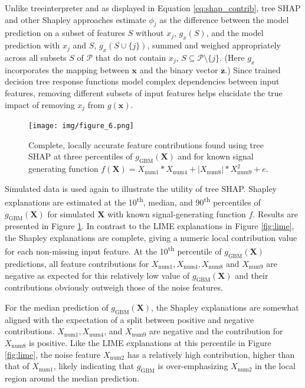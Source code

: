 \documentclass[sigconf, review]{acmart}
\begin{document}
\noindent Unlike treeinterpreter and as displayed in Equation \ref{eq:shap_contrib}, tree SHAP and other Shapley approaches estimate $\phi_j$ as the difference between the model prediction on a subset of features $S$ without $x_j$, $g_x(S)$, and the model prediction with $x_j$ and $S$, $g_x(S \cup \{j\})$, summed and weighed appropriately across all subsets $S$ of $\mathcal{P}$ that do not contain $x_j$, $S \subseteq \mathcal{P} \setminus \{j\}$. (Here $g_x$ incorporates the mapping between $\mathbf{x}$ and the binary vector $\mathbf{z}$.) Since trained decision tree response functions model complex dependencies between input features, removing different subsets of input features helps elucidate the true impact of removing $x_j$ from $g(\mathbf{x})$.

\begin{figure}[htb]
	\begin{center}
		\texttt{[image: img/figure\_6.png]}
		\caption{Complete, locally accurate feature contributions found using tree SHAP at three percentiles of $g_{\text{GBM}}(\mathbf{X})$ and for known signal generating function $f(\mathbf{X}) = X_{\text{num}1} * X_{\text{num}4} + |X_{\text{num}8}| * X_{\text{num}9}^2 + e$.}
		\label{fig:shap}
	\end{center}
\end{figure}

Simulated data is used again to illustrate the utility of tree SHAP. Shapley explanations are estimated at the 10\textsuperscript{th}, median, and 90\textsuperscript{th} percentiles of $g_{\text{GBM}}(\mathbf{X})$ for simulated $\mathbf{X}$ with known signal-generating function $f$. Results are presented in Figure \ref{fig:shap}. In contrast to the LIME explanations in Figure \ref{fig:lime}, the Shapley explanations are complete, giving a numeric local contribution value for each non-missing input feature. At the 10\textsuperscript{th} percentile of $g_{\text{GBM}}(\mathbf{X})$ predictions, all feature contributions for $X_{\text{num}1}, X_{\text{num}4}, X_{\text{num}8}$ and $X_{\text{num}9}$ are negative as expected for this relatively low value of $g_{\text{GBM}}(\mathbf{X})$ and their contributions obviously outweigh those of the noise features.

For the median prediction of $g_{\text{GBM}}(\mathbf{X})$, the Shapley explanations are somewhat aligned with the expectation of a split between positive and negative contributions. $X_{\text{num}1}, X_{\text{num}4}$, and $X_{\text{num}9}$ are negative and the contribution for $X_{\text{num}8}$ is positive. Like the LIME explanations at this percentile in Figure \ref{fig:lime}, the noise feature $X_{\text{num}2}$ has a relatively high contribution, higher than that of $X_{\text{num}1}$, likely indicating that $g_{\text{GBM}}$ is over-emphasizing $X_{\text{num}2}$ in the local region around the median prediction. 
\end{document}

